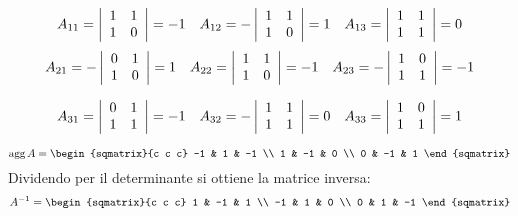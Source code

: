 \begin{esempio}
    \[
        A_{11} = \left|
        \begin{array}{c c}
            1 & 1 \\
            1 & 0
        \end{array}
        \right|
        = -1
        \quad
        A_{12} = -\left|
        \begin{array}{c c}
            1 & 1 \\
            1 & 0
        \end{array}
        \right|
        = 1
        \quad
        A_{13} = \left|
        \begin{array}{c c}
            1 & 1 \\
            1 & 1
        \end{array}
        \right|
        = 0
    \]
    \[
        A_{21} = -\left|
        \begin{array}{c c}
            0 & 1 \\
            1 & 0
        \end{array}
        \right|
        = 1
        \quad
        A_{22} = \left|
        \begin{array}{c c}
            1 & 1 \\
            1 & 0
        \end{array}
        \right|
        = -1
        \quad
        A_{23} = -\left|
        \begin{array}{c c}
            1 & 0 \\
            1 & 1
        \end{array}
        \right|
        = -1
    \]

    \[
        A_{31} = \left|
        \begin{array}{c c}
            0 & 1 \\
            1 & 1
        \end{array}
        \right|
        = -1
        \quad
        A_{32} = -\left|
        \begin{array}{c c}
            1 & 1 \\
            1 & 1
        \end{array}
        \right|
        = 0
        \quad
        A_{33} = \left|
        \begin{array}{c c}
            1 & 0 \\
            1 & 1
        \end{array}
        \right|
        = 1
    \]
    
    \[
        \text{agg}\,A =
        \begin{sqmatrix}{c c c}
            -1 & 1 & -1 \\
            1 & -1 & 0 \\
            0 & -1 & 1
        \end{sqmatrix}
    \]
    Dividendo per il determinante si ottiene la matrice inversa:
    \[
        A^{-1} =
        \begin{sqmatrix}{c c c}
            1 & -1 & 1 \\
            -1 & 1 & 0 \\
            0 & 1 & -1
        \end{sqmatrix}
    \]
\end{esempio}

